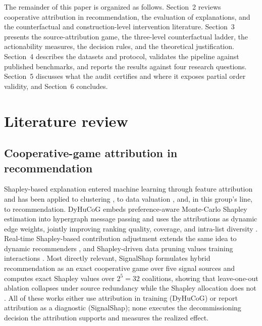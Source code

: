 \documentclass[pdflatex,sn-mathphys-num]{sn-jnl}
\theoremstyle{thmstyleone}%
\theoremstyle{thmstyletwo}%
\theoremstyle{thmstylethree}%
\begin{document}
The remainder of this paper is organized as follows. Section~2 reviews cooperative attribution in recommendation, the evaluation of explanations, and the counterfactual and construction-level intervention literature. Section~3 presents the source-attribution game, the three-level counterfactual ladder, the actionability measures, the decision rules, and the theoretical justification. Section~4 describes the datasets and protocol, validates the pipeline against published benchmarks, and reports the results against four research questions. Section~5 discusses what the audit certifies and where it exposes partial order validity, and Section~6 concludes.

\section{Literature review}\label{sec2}

\subsection{Cooperative-game attribution in recommendation}\label{subsec2_1}

Shapley-based explanation entered machine learning through feature attribution \cite{shapley1953,lundberg2017,lundberg2020} and has been applied to clustering \cite{louhichi2023,louhichi2025}, to data valuation \cite{ghorbani2019}, and, in this group's line, to recommendation. DyHuCoG embeds preference-aware Monte-Carlo Shapley estimation into hypergraph message passing and uses the attributions as dynamic edge weights, jointly improving ranking quality, coverage, and intra-list diversity \cite{louhichi2026}. Real-time Shapley-based contribution adjustment extends the same idea to dynamic recommenders \cite{nesmaoui2025}, and Shapley-driven data pruning values training interactions \cite{zhang2025}. Most directly relevant, SignalShap formulates hybrid recommendation as an exact cooperative game over five signal sources and computes exact Shapley values over $2^5=32$ coalitions, showing that leave-one-out ablation collapses under source redundancy while the Shapley allocation does not \cite{louhichi2026signalshap}. All of these works either use attribution in training (DyHuCoG) or report attribution as a diagnostic (SignalShap); none executes the decommissioning decision the attribution supports and measures the realized effect.
\end{document}
